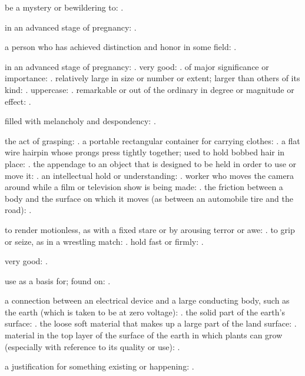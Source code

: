  be a mystery or bewildering to: .

  in an advanced stage of pregnancy: .

  a person who has achieved distinction and honor in some field: .

  in an advanced stage of pregnancy: . very good: . of major significance or importance: . relatively large in size or number or extent; larger than others of its kind: . uppercase: . remarkable or out of the ordinary in degree or magnitude or effect: .

  filled with melancholy and despondency: .

  the act of grasping: . a portable rectangular container for carrying clothes: . a flat wire hairpin whose prongs press tightly together; used to hold bobbed hair in place: . the appendage to an object that is designed to be held in order to use or move it: . an intellectual hold or understanding: . worker who moves the camera around while a film or television show is being made: . the friction between a body and the surface on which it moves (as between an automobile tire and the road): .

  to render motionless, as with a fixed stare or by arousing terror or awe: . to grip or seize, as in a wrestling match: . hold fast or firmly: .

  very good: .

  use as a basis for; found on: .

  a connection between an electrical device and a large conducting body, such as the earth (which is taken to be at zero voltage): . the solid part of the earth's surface: . the loose soft material that makes up a large part of the land surface: . material in the top layer of the surface of the earth in which plants can grow (especially with reference to its quality or use): .

  a justification for something existing or happening: .

